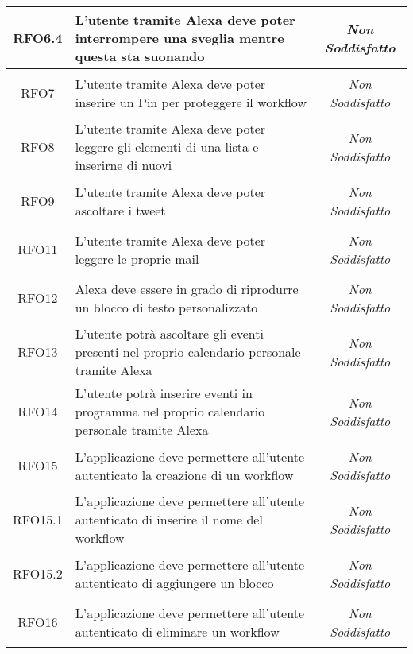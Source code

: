 \begin{longtable}{|c|>{\centering}m{7cm}|c|}
	\hypertarget{RFO6.4}{RFO6.4} & L'utente tramite Alexa deve poter interrompere una sveglia mentre questa sta suonando & {\textit{Non Soddisfatto}}\\ \hline
	
	\hypertarget{RFO7}{RFO7} & L'utente tramite Alexa deve poter inserire un Pin per proteggere il workflow & {\textit{Non Soddisfatto}}\\ \hline
	
	\hypertarget{RFO8}{RFO8} & L'utente tramite Alexa deve poter leggere gli elementi di una lista e inserirne di nuovi & {\textit{Non Soddisfatto}}\\ \hline
	
	\hypertarget{RFO9}{RFO9} & L'utente tramite Alexa deve poter ascoltare i tweet & {\textit{Non Soddisfatto}}\\ \hline
	
	\hypertarget{RFO11}{RFO11} & L'utente tramite Alexa deve poter leggere le proprie mail & {\textit{Non Soddisfatto}}\\ \hline
	
	\hypertarget{RFO12}{RFO12} & Alexa deve essere in grado di riprodurre un blocco di testo personalizzato & {\textit{Non Soddisfatto}}\\ \hline
	
	\hypertarget{RFO13}{RFO13} & L'utente potrà ascoltare gli eventi presenti nel proprio calendario personale tramite Alexa & {\textit{Non Soddisfatto}}\\ \hline
	
	\hypertarget{RFO14}{RFO14} & L'utente potrà inserire eventi in programma nel proprio calendario personale tramite Alexa & {\textit{Non Soddisfatto}}\\ \hline
	
	\hypertarget{RFO15}{RFO15} & L'applicazione deve permettere all'utente autenticato la creazione di un workflow & {\textit{Non Soddisfatto}}\\ \hline
	
	\hypertarget{RFO15.1}{RFO15.1} & L'applicazione deve permettere all'utente autenticato di inserire il nome del workflow & {\textit{Non Soddisfatto}}\\ \hline
	
	\hypertarget{RFO15.2}{RFO15.2} & L'applicazione deve permettere all'utente autenticato di aggiungere un blocco & {\textit{Non Soddisfatto}}\\ \hline
	
	\hypertarget{RFO16}{RFO16} & L'applicazione deve permettere all'utente autenticato di eliminare un workflow & {\textit{Non Soddisfatto}}\\ \hline
	

\end{longtable}
